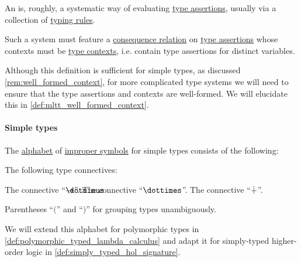 \begin{definition}\label{def:abstract_type_system}\mimprovised
  An  is, roughly, a systematic way of evaluating \hyperref[def:type_assertion]{type assertions}, usually via a collection of \hyperref[con:typing_rule]{typing rules}.

  Such a system must feature a \hyperref[def:consequence_relation]{consequence relation} on \hyperref[def:type_assertion]{type assertions} whose contexts must be \hyperref[def:type_context]{type contexts}, i.e. contain type assertions for distinct variables.
\end{definition}
\begin{comments}
  \item Although this definition is sufficient for simple types, as discussed \cref{rem:well_formed_context}, for more complicated type systems we will need to ensure that the type assertions and contexts are well-formed. We will elucidate this in \cref{def:mltt_well_formed_context}.
\end{comments}

\paragraph{Simple types}

\begin{definition}\label{def:simple_type_alphabet}\mimprovised
  The \hyperref[def:formal_language/alphabet]{alphabet} of \hyperref[con:improper_symbol]{improper symbols} for simple types consists of the following:

  \begin{thmenum}
     The following type connectives:
    \begin{thmenum}
       The  connective \enquote{\( \synimplies \)}.
       The  connective \enquote{\( \syntimes \)}.
       The  connective \enquote{\( \mathbin{\dotplus} \)}.
    \end{thmenum}

     Parentheses \enquote{\( ( \)} and \enquote{\( ) \)} for grouping types unambiguously.
  \end{thmenum}
\end{definition}
\begin{comments}
  \item We will extend this alphabet for polymorphic types in \cref{def:polymorphic_typed_lambda_calculus} and adapt it for simply-typed higher-order logic in \cref{def:simply_typed_hol_signature}.
\end{comments}

